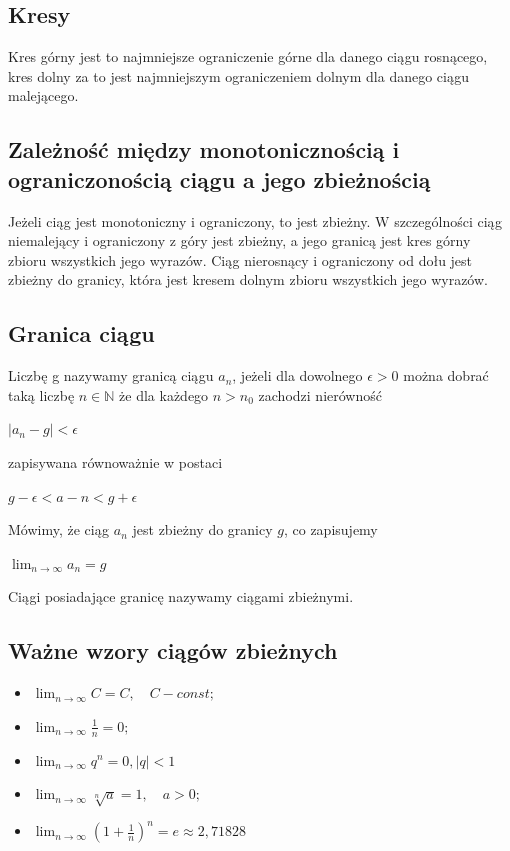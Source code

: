 \documentclass[]{article}
\begin{document}
\subsection{Kresy}
	
      \begin{tw}
      	Kres górny jest to najmniejsze ograniczenie górne dla danego ciągu rosnącego, kres dolny za to jest najmniejszym ograniczeniem dolnym dla danego ciągu malejącego.
      \end{tw}	
\subsection{Zależność między monotonicznością i ograniczonością ciągu a jego zbieżnością}
	\begin{df}
		Jeżeli ciąg jest monotoniczny i ograniczony, to jest zbieżny.
		 W szczególności  ciąg niemalejący i ograniczony z góry jest zbieżny, a jego granicą jest kres górny zbioru wszystkich jego wyrazów. 
		Ciąg nierosnący i ograniczony od dołu jest zbieżny do granicy, która jest kresem dolnym zbioru wszystkich jego wyrazów. 
	\end{df}
	\subsection{Granica ciągu}
	\begin{df}
		Liczbę g nazywamy granicą ciągu ${a_n}$, jeżeli dla dowolnego $\epsilon > 0$  można dobrać taką liczbę $n \in \mathbb{N}$ że dla każdego $n > n_0$ zachodzi nierówność
		\begin{center}
			$\lvert a_n -g \rvert < \epsilon $
		\end{center}
		zapisywana równoważnie w postaci 
		\begin{center}
			$ g - \epsilon < a-n < g + \epsilon $
		\end{center}
		Mówimy, że ciąg ${a_n}$ jest zbieżny do granicy $g$, co zapisujemy 
		\begin{center}
			$\lim_{n \to \infty} a_n = g$
		\end{center}
		Ciągi posiadające granicę nazywamy ciągami zbieżnymi.		
	\end{df}
\subsection {Ważne wzory ciągów zbieżnych}
\begin{itemize}
\item $\lim_{n \to \infty} C = C,\quad C- const;$
\item $\lim_{n \to \infty} \frac{1}{n} = 0 ;$
\item $\lim_{n \to \infty} q^n =0,\lvert q \rvert < 1$
\item $\lim_{n \to \infty} \sqrt[n]{a} = 1 , \quad a > 0;$
\item $\lim_{n \to \infty} (1+\frac{1}{n})^n= e \approx 2, 71828$
\end{itemize}
\end{document}

